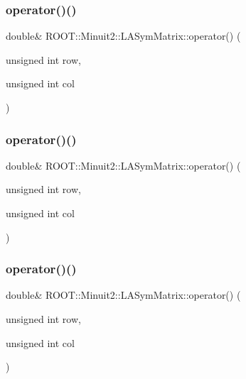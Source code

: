 \subsubsection{\texorpdfstring{operator()()}{operator()()}\hspace{0.1cm}{\footnotesize\ttfamily [4/6]}}
{\footnotesize\ttfamily double\& R\+O\+O\+T\+::\+Minuit2\+::\+L\+A\+Sym\+Matrix\+::operator() (\begin{DoxyParamCaption}\item[{unsigned int}]{row,  }\item[{unsigned int}]{col }\end{DoxyParamCaption})\hspace{0.3cm}{\ttfamily [inline]}}

\mbox{\label{classROOT_1_1Minuit2_1_1LASymMatrix_a580d204fdc526218483e7b2e276da265}} 
\subsubsection{\texorpdfstring{operator()()}{operator()()}\hspace{0.1cm}{\footnotesize\ttfamily [5/6]}}
{\footnotesize\ttfamily double\& R\+O\+O\+T\+::\+Minuit2\+::\+L\+A\+Sym\+Matrix\+::operator() (\begin{DoxyParamCaption}\item[{unsigned int}]{row,  }\item[{unsigned int}]{col }\end{DoxyParamCaption})\hspace{0.3cm}{\ttfamily [inline]}}

\mbox{\label{classROOT_1_1Minuit2_1_1LASymMatrix_a580d204fdc526218483e7b2e276da265}} 
\subsubsection{\texorpdfstring{operator()()}{operator()()}\hspace{0.1cm}{\footnotesize\ttfamily [6/6]}}
{\footnotesize\ttfamily double\& R\+O\+O\+T\+::\+Minuit2\+::\+L\+A\+Sym\+Matrix\+::operator() (\begin{DoxyParamCaption}\item[{unsigned int}]{row,  }\item[{unsigned int}]{col }\end{DoxyParamCaption})\hspace{0.3cm}{\ttfamily [inline]}}

